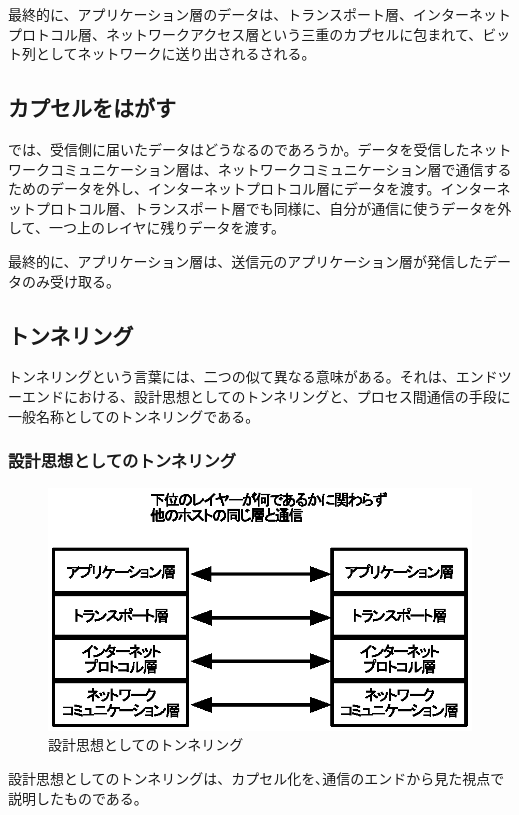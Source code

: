 最終的に、アプリケーション層のデータは、トランスポート層、インターネットプロトコル層、ネットワークアクセス層という三重のカプセルに包まれて、ビット列としてネットワークに送り出されるされる。

\subsection{カプセルをはがす}
では、受信側に届いたデータはどうなるのであろうか。データを受信したネットワークコミュニケーション層は、ネットワークコミュニケーション層で通信するためのデータを外し、インターネットプロトコル層にデータを渡す。インターネットプロトコル層、トランスポート層でも同様に、自分が通信に使うデータを外して、一つ上のレイヤに残りデータを渡す。

最終的に、アプリケーション層は、送信元のアプリケーション層が発信したデータのみ受け取る。

\subsection{トンネリング}
トンネリングという言葉には、二つの似て異なる意味がある。それは、エンドツーエンドにおける、設計思想としてのトンネリングと、プロセス間通信の手段に一般名称としてのトンネリングである。

\subsubsection{設計思想としてのトンネリング}

\begin{figure}
	\includegraphics[width=12cm,clip]{draw/tunneling.eps}
	\caption{設計思想としてのトンネリング}
	\label{fig:tunneling}
\end{figure}

設計思想としてのトンネリングは、カプセル化を､通信のエンドから見た視点で説明したものである。

